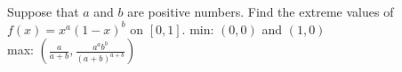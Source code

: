 {Suppose that $a$ and $b$ are positive numbers.  Find the extreme values of $f(x)=x^a(1-x)^b$ on $[0,1]$.}
{min: $(0,0)$ and $(1,0)$\\ max: $(\frac a{a+b},\frac{a^ab^b}{(a+b)^{a+b}})$}
